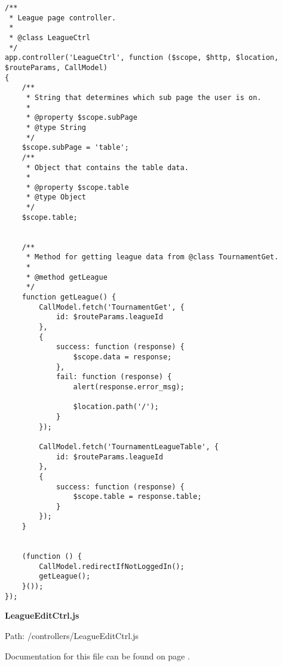 {\scriptsize
\begin{lstlisting}
/**
 * League page controller.
 *
 * @class LeagueCtrl
 */
app.controller('LeagueCtrl', function ($scope, $http, $location, $routeParams, CallModel)
{
	/**
	 * String that determines which sub page the user is on.
	 *
	 * @property $scope.subPage
	 * @type String
	 */
	$scope.subPage = 'table';
	/**
	 * Object that contains the table data.
	 *
	 * @property $scope.table
	 * @type Object
	 */
	$scope.table;


	/**
	 * Method for getting league data from @class TournamentGet.
	 *
	 * @method getLeague
	 */
	function getLeague() {
		CallModel.fetch('TournamentGet', {
			id: $routeParams.leagueId
		},
		{
			success: function (response) {
				$scope.data = response;
			},
			fail: function (response) {
				alert(response.error_msg);

				$location.path('/');
			}
		});

		CallModel.fetch('TournamentLeagueTable', {
			id: $routeParams.leagueId
		},
		{
			success: function (response) {
				$scope.table = response.table;
			}
		});
	}


	(function () {
		CallModel.redirectIfNotLoggedIn();
		getLeague();
	}());
});\end{lstlisting}
}
\textbf{LeagueEditCtrl.js}\label{LeagueEditCtrl.js}

Path: /controllers/LeagueEditCtrl.js

Documentation for this file can be found on page \pageref{LeagueEditCtrl.js.doc}.

